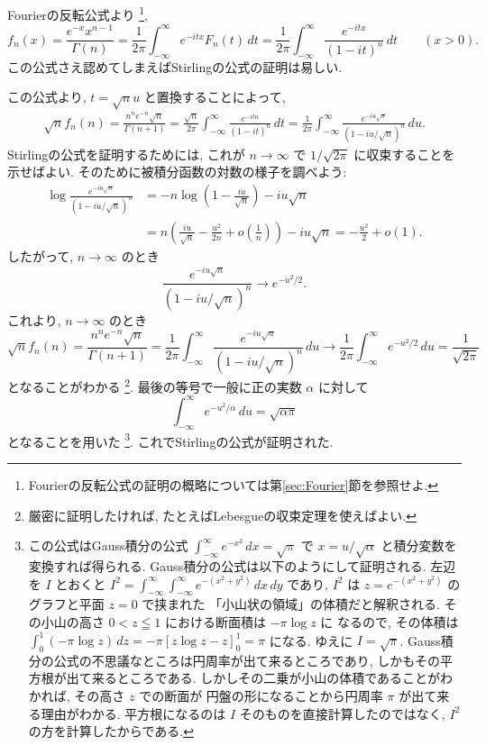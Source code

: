 \documentclass[12pt,twoside]{jarticle}
\theoremstyle{jplain}
\theoremstyle{jplain}
\theoremstyle{jplain}
\numberwithin{theorem}{section}
\numberwithin{equation}{section}
\numberwithin{figure}{section}
\numberwithin{table}{section}
\newcommand\secref[1]{第\ref{#1}節}
\begin{document}
Fourierの反転公式より%
\footnote{Fourierの反転公式の証明の概略については\secref{sec:Fourier}を参照せよ.}, 
\[
f_n(x)
=
\frac{e^{-x} x^{n-1}}{\Gamma(n)}
=
\frac{1}{2\pi}\int_{-\infty}^\infty e^{-itx}F_n(t)\,dt
=
\frac{1}{2\pi}\int_{-\infty}^\infty \frac{e^{-itx}}{(1-it)^n}\,dt
\qquad (x>0).
\]
この公式さえ認めてしまえばStirlingの公式の証明は易しい.

この公式より, $t=\sqrt{n}u$ と置換することによって,
\begin{align*}
\sqrt{n}f_n(n)
=
\frac{n^n e^{-n}\sqrt{n}}{\Gamma(n+1)}
=
\frac{\sqrt{n}}{2\pi}
\int_{-\infty}^\infty
\frac{e^{-itn}}{(1-it)^n}
\,dt
=
\frac{1}{2\pi}
\int_{-\infty}^\infty
\frac{e^{-iu\sqrt{n}}}{(1-iu/\sqrt{n})^n}\,du.
\end{align*}
Stirlingの公式を証明するためには, 
これが $n\to\infty$ で $1/\sqrt{2\pi}$ に収束することを示せばよい.
そのために被積分函数の対数の様子を調べよう:
\begin{align*}
\log\frac{e^{-iu\sqrt{n}}}{(1-iu/\sqrt{n})^n}
&
=-n\log\left(1-\frac{iu}{\sqrt{n}}\right)-iu\sqrt{n}
\\&
=n\left(\frac{iu}{\sqrt{n}}-\frac{u^2}{2n}+o\left(\frac{1}{n}\right)\right)-iu\sqrt{n}
=-\frac{u^2}{2} + o(1).
\end{align*}
したがって, $n\to\infty$ のとき
\[
\frac{e^{-iu\sqrt{n}}}{(1-iu/\sqrt{n})^n} \longrightarrow e^{-u^2/2}.
\]
これより, $n\to\infty$ のとき
\[
\sqrt{n}f_n(n)
=
\frac{n^n e^{-n}\sqrt{n}}{\Gamma(n+1)}
=
\frac{1}{2\pi}
\int_{-\infty}^\infty
\frac{e^{-iu\sqrt{n}}}{(1-iu/\sqrt{n})^n}\,du
\longrightarrow
\frac{1}{2\pi}
\int_{-\infty}^\infty
e^{-u^2/2}\,du
=
\frac{1}{\sqrt{2\pi}}
\]
となることがわかる%
\footnote{厳密に証明したければ, たとえばLebesgueの収束定理を使えばよい.}.
最後の等号で一般に正の実数 $\alpha$ に対して
\[
\int_{-\infty}^\infty e^{-u^2/\alpha}\,du = \sqrt{\alpha\pi}
\]
となることを用いた%
\footnote{この公式はGauss積分の公式 
$\int_{-\infty}^\infty e^{-x^2}\,dx=\sqrt{\pi}$ 
で $x=u/\sqrt{\alpha}$ と積分変数を変換すれば得られる.
Gauss積分の公式は以下のようにして証明される.
左辺を $I$ とおくと 
$I^2=\int_{-\infty}^\infty\int_{-\infty}^\infty e^{-(x^2+y^2)}\,dx\,dy$
であり, $I^2$ は $z=e^{-(x^2+y^2)}$ のグラフと平面 $z=0$ で挟まれた
「小山状の領域」の体積だと解釈される.
その小山の高さ $0< z\leqq 1$ における断面積は $-\pi \log z$ に
なるので, その体積は $\int_0^1(-\pi\log z)\,dz=-\pi[z\log z-z]_0^1=\pi$ 
になる. ゆえに $I=\sqrt{\pi}$.
Gauss積分の公式の不思議なところは円周率が出て来るところであり,  
しかもその平方根が出て来るところである.
しかしその二乗が小山の体積であることがわかれば, その高さ $z$ での断面が
円盤の形になることから円周率 $\pi$ が出て来る理由がわかる. 
平方根になるのは $I$ そのものを直接計算したのではなく, 
$I^2$ の方を計算したからである.
}. %
これでStirlingの公式が証明された.
\end{document}
